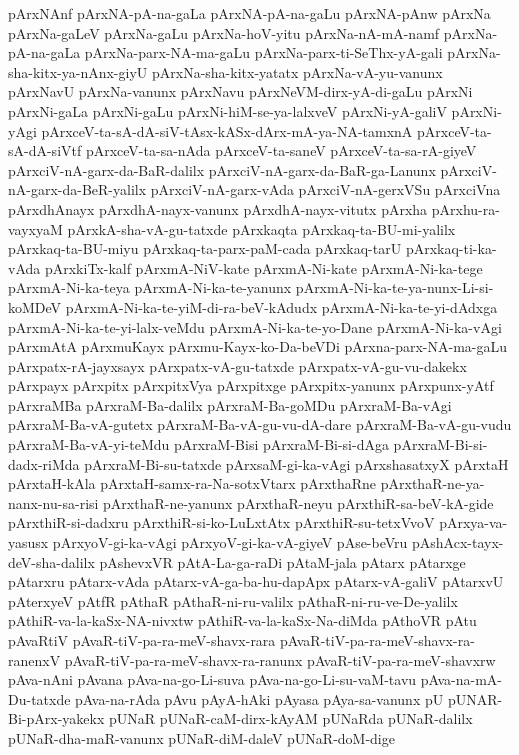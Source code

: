 {pArxNAnf
pArxNA-pA-na-gaLa
pArxNA-pA-na-gaLu
pArxNA-pAnw
pArxNa
pArxNa-gaLeV
pArxNa-gaLu
pArxNa-hoV-yitu
pArxNa-nA-mA-namf
pArxNa-pA-na-gaLa
pArxNa-parx-NA-ma-gaLu
pArxNa-parx-ti-SeThx-yA-gali
pArxNa-sha-kitx-ya-nAnx-giyU
pArxNa-sha-kitx-yatatx
pArxNa-vA-yu-vanunx
pArxNavU
pArxNa-vanunx
pArxNavu
pArxNeVM-dirx-yA-di-gaLu
pArxNi
pArxNi-gaLa
pArxNi-gaLu
pArxNi-hiM-se-ya-lalxveV
pArxNi-yA-galiV
pArxNi-yAgi
pArxceV-ta-sA-dA-siV-tAsx-kASx-dArx-mA-ya-NA-tamxnA
pArxceV-ta-sA-dA-siVtf
pArxceV-ta-sa-nAda
pArxceV-ta-saneV
pArxceV-ta-sa-rA-giyeV
pArxciV-nA-garx-da-BaR-dalilx
pArxciV-nA-garx-da-BaR-ga-Lanunx
pArxciV-nA-garx-da-BeR-yalilx
pArxciV-nA-garx-vAda
pArxciV-nA-gerxVSu
pArxciVna
pArxdhAnayx
pArxdhA-nayx-vanunx
pArxdhA-nayx-vitutx
pArxha
pArxhu-ra-vayxyaM
pArxkA-sha-vA-gu-tatxde
pArxkaqta
pArxkaq-ta-BU-mi-yalilx
pArxkaq-ta-BU-miyu
pArxkaq-ta-parx-paM-cada
pArxkaq-tarU
pArxkaq-ti-ka-vAda
pArxkiTx-kalf
pArxmA-NiV-kate
pArxmA-Ni-kate
pArxmA-Ni-ka-tege
pArxmA-Ni-ka-teya
pArxmA-Ni-ka-te-yanunx
pArxmA-Ni-ka-te-ya-nunx-Li-si-koMDeV
pArxmA-Ni-ka-te-yiM-di-ra-beV-kAdudx
pArxmA-Ni-ka-te-yi-dAdxga
pArxmA-Ni-ka-te-yi-lalx-veMdu
pArxmA-Ni-ka-te-yo-Dane
pArxmA-Ni-ka-vAgi
pArxmAtA
pArxmuKayx
pArxmu-Kayx-ko-Da-beVDi
pArxna-parx-NA-ma-gaLu
pArxpatx-rA-jayxsayx
pArxpatx-vA-gu-tatxde
pArxpatx-vA-gu-vu-dakekx
pArxpayx
pArxpitx
pArxpitxVya
pArxpitxge
pArxpitx-yanunx
pArxpunx-yAtf
pArxraMBa
pArxraM-Ba-dalilx
pArxraM-Ba-goMDu
pArxraM-Ba-vAgi
pArxraM-Ba-vA-gutetx
pArxraM-Ba-vA-gu-vu-dA-dare
pArxraM-Ba-vA-gu-vudu
pArxraM-Ba-vA-yi-teMdu
pArxraM-Bisi
pArxraM-Bi-si-dAga
pArxraM-Bi-si-dadx-riMda
pArxraM-Bi-su-tatxde
pArxsaM-gi-ka-vAgi
pArxshasatxyX
pArxtaH
pArxtaH-kAla
pArxtaH-samx-ra-Na-sotxVtarx
pArxthaRne
pArxthaR-ne-ya-nanx-nu-sa-risi
pArxthaR-ne-yanunx
pArxthaR-neyu
pArxthiR-sa-beV-kA-gide
pArxthiR-si-dadxru
pArxthiR-si-ko-LuLxtAtx
pArxthiR-su-tetxVvoV
pArxya-va-yasusx
pArxyoV-gi-ka-vAgi
pArxyoV-gi-ka-vA-giyeV
pAse-beVru
pAshAcx-tayx-deV-sha-dalilx
pAshevxVR
pAtA-La-ga-raDi
pAtaM-jala
pAtarx
pAtarxge
pAtarxru
pAtarx-vAda
pAtarx-vA-ga-ba-hu-dapApx
pAtarx-vA-galiV
pAtarxvU
pAterxyeV
pAtfR
pAthaR
pAthaR-ni-ru-valilx
pAthaR-ni-ru-ve-De-yalilx
pAthiR-va-la-kaSx-NA-nivxtw
pAthiR-va-la-kaSx-Na-diMda
pAthoVR
pAtu
pAvaRtiV
pAvaR-tiV-pa-ra-meV-shavx-rara
pAvaR-tiV-pa-ra-meV-shavx-ra-ranenxV
pAvaR-tiV-pa-ra-meV-shavx-ra-ranunx
pAvaR-tiV-pa-ra-meV-shavxrw
pAva-nAni
pAvana
pAva-na-go-Li-suva
pAva-na-go-Li-su-vaM-tavu
pAva-na-mA-Du-tatxde
pAva-na-rAda
pAvu
pAyA-hAki
pAyasa
pAya-sa-vanunx
pU
pUNAR-Bi-pArx-yakekx
pUNaR
pUNaR-caM-dirx-kAyAM
pUNaRda
pUNaR-dalilx
pUNaR-dha-maR-vanunx
pUNaR-diM-daleV
pUNaR-doM-dige
}
